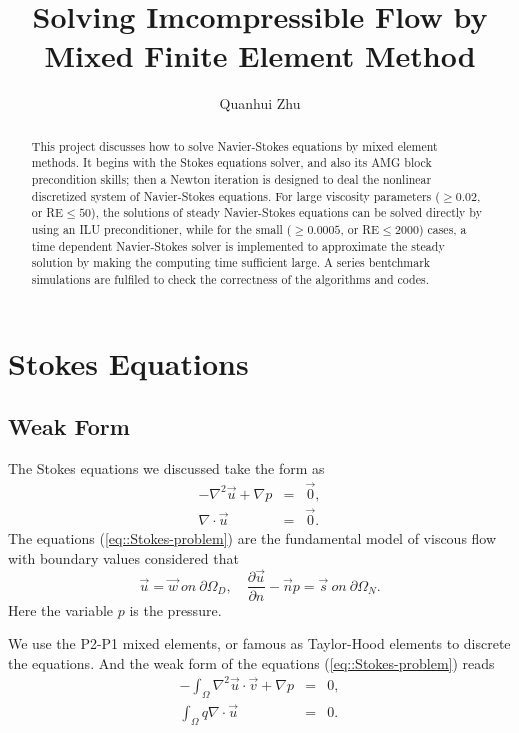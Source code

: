 \documentclass[a4paper]{article}
\title{Solving Imcompressible Flow by Mixed Finite Element Method}
\author{Quanhui Zhu}
\begin{document}
\maketitle

\begin{abstract}
  This project discusses how to solve Navier-Stokes equations by mixed
  element methods. It begins with the Stokes equations solver, and
  also its AMG block precondition skills; then a Newton iteration is
  designed to deal the nonlinear discretized system of Navier-Stokes
  equations.  For large viscosity parameters ($\geq 0.02$, or RE$\leq
  50$), the solutions of steady Navier-Stokes equations can be solved
  directly by using an ILU preconditioner, while for the small ($\geq
  0.0005$, or RE$\leq 2000$) cases, a time dependent Navier-Stokes
  solver is implemented to approximate the steady solution by making
  the computing time sufficient large. A series bentchmark simulations
  are fulfiled to check the correctness of the algorithms and codes.
\end{abstract}


\section{Stokes Equations}

\subsection{Weak Form}

The Stokes equations we discussed take the form as
\begin{equation}
\begin{array}{rcl}
-\nabla^2 \vec{u} + \nabla p &=& \vec{0}, \\
\nabla \cdot \vec{u} &=& \vec{0}.
\label{eq::Stokes-problem}
\end{array}
\end{equation}
The equations (\ref{eq::Stokes-problem}) are the fundamental model of
viscous flow with boundary values considered that
\begin{equation}
\vec{u} = \vec{w} \ on \ \partial \Omega_D ,\quad \frac{\partial
  \vec{u}}{\partial n} - \vec{n} p = \vec{s} \ on \ \partial \Omega_N.
\end{equation}
Here the variable $p$ is the pressure.

We use the P2-P1 mixed elements, or famous as Taylor-Hood elements
\cite{Lee2005Finite} to discrete the equations. And the weak form of
the equations (\ref{eq::Stokes-problem}) reads
\begin{equation}
\begin{array}{rcl}
-\int_\Omega \nabla^2 \vec{u} \cdot \vec{v} + \nabla p &=& 0,\\
\int_\Omega q\nabla \cdot \vec{u} &=& 0.
\label{eq::Stokes-weakform}
\end{array}
\end{equation}
\end{document}
